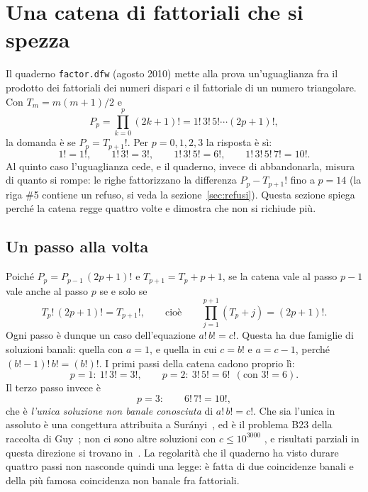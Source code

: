 \section{Una catena di fattoriali che si spezza}
\label{sec:fattoriali}

Il quaderno \texttt{factor.dfw} (agosto 2010) mette alla prova
un'uguaglianza fra il prodotto dei fattoriali dei numeri dispari e il
fattoriale di un numero triangolare. Con $T_m=m(m+1)/2$ e
\[
  P_p=\prod_{k=0}^{p}(2k+1)!=1!\,3!\,5!\cdots(2p+1)!,
\]
la domanda \`e se $P_p=T_{p+1}!$. Per $p=0,1,2,3$ la risposta \`e s\`i:
\[
  1!=1!,\qquad 1!\,3!=3!,\qquad 1!\,3!\,5!=6!,\qquad 1!\,3!\,5!\,7!=10!.
\]
Al quinto caso l'uguaglianza cede, e il quaderno, invece di abbandonarla,
misura di quanto si rompe: le righe  fattorizzano
la differenza $P_p-T_{p+1}!$ fino a $p=14$ (la riga \#5 contiene un refuso,
si veda la sezione~\ref{sec:refusi}). Questa sezione spiega perch\'e la
catena regge quattro volte e dimostra che non si richiude pi\`u.

\subsection{Un passo alla volta}

Poich\'e $P_p=P_{p-1}\,(2p+1)!$ e $T_{p+1}=T_p+p+1$, se la catena vale al
passo $p-1$ vale anche al passo $p$ se e solo se
\begin{equation}\label{eq:passo}
  T_p!\,(2p+1)!=T_{p+1}!,
  \qquad\text{cio\`e}\qquad
  \prod_{j=1}^{p+1}(T_p+j)=(2p+1)!.
\end{equation}
Ogni passo \`e dunque un caso dell'equazione $a!\,b!=c!$. Questa ha due
famiglie di soluzioni banali: quella con $a=1$, e quella in cui $c=b!$ e
$a=c-1$, perch\'e $(b!-1)!\,b!=(b!)!$. I primi passi della catena cadono
proprio l\`i:
\[
  p=1:\ 1!\,3!=3!,\qquad
  p=2:\ 3!\,5!=6!\ \ (\text{con }3!=6).
\]
Il terzo passo invece \`e
\[
  p=3:\qquad 6!\,7!=10!,
\]
che \`e \emph{l'unica soluzione non banale conosciuta} di $a!\,b!=c!$.
Che sia l'unica in assoluto \`e una congettura attribuita a
Sur\'anyi~\cite{erdos373}, ed \`e il problema B23 della raccolta di
Guy~\cite{guy2004}; non ci sono altre soluzioni con $c\le10^{3000}$
\cite{erdos373}, e risultati parziali in questa direzione si trovano
in~\cite{hajdu2018}. La regolarit\`a che il quaderno ha visto durare quattro
passi non nasconde quindi una legge: \`e fatta di due coincidenze banali e
della pi\`u famosa coincidenza non banale fra fattoriali.

